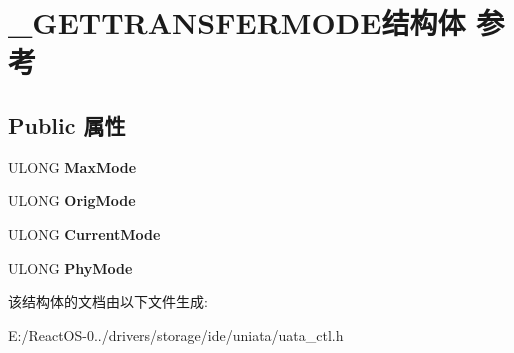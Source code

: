 \hypertarget{struct___g_e_t_t_r_a_n_s_f_e_r_m_o_d_e}{}\section{\+\_\+\+G\+E\+T\+T\+R\+A\+N\+S\+F\+E\+R\+M\+O\+D\+E结构体 参考}
\label{struct___g_e_t_t_r_a_n_s_f_e_r_m_o_d_e}
\subsection*{Public 属性}
\begin{DoxyCompactItemize}
\item 
\mbox{\label{struct___g_e_t_t_r_a_n_s_f_e_r_m_o_d_e_a4d9ba31af778ec7aff0b79a68ccfc2b2}} 
U\+L\+O\+NG {\bfseries Max\+Mode}
\item 
\mbox{\label{struct___g_e_t_t_r_a_n_s_f_e_r_m_o_d_e_a628154a5212d98cd6f9e8615f391f84c}} 
U\+L\+O\+NG {\bfseries Orig\+Mode}
\item 
\mbox{\label{struct___g_e_t_t_r_a_n_s_f_e_r_m_o_d_e_a763e39de642682e3350997d39264851d}} 
U\+L\+O\+NG {\bfseries Current\+Mode}
\item 
\mbox{\label{struct___g_e_t_t_r_a_n_s_f_e_r_m_o_d_e_a879b81d1eaa6bea40041082c44570b58}} 
U\+L\+O\+NG {\bfseries Phy\+Mode}
\end{DoxyCompactItemize}


该结构体的文档由以下文件生成\+:\begin{DoxyCompactItemize}
\item 
E\+:/\+React\+O\+S-\/0../drivers/storage/ide/uniata/uata\+\_\+ctl.\+h\end{DoxyCompactItemize}
